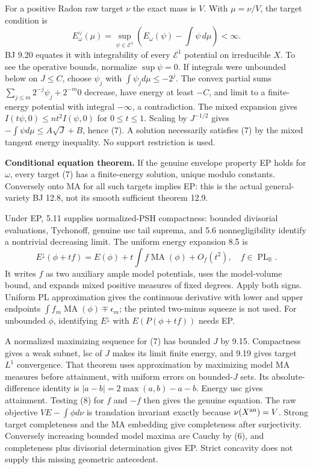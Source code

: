\documentclass[
  10pt,
]{article}
\begin{document}
For a positive Radon raw target \(\nu\) the exact mass is \(V\). With
\(\mu=\nu/V\), the target condition is
\[E^\vee_\omega(\mu)=\sup_{\psi\in\mathcal E^1}
 \left(E_\omega(\psi)-\int\psi\,d\mu\right)<\infty. \tag{7}\] BJ 9.20
equates it with integrability of every \(\mathcal E^1\) potential on
irreducible \(X\). To see the operative bounds, normalize
\(\sup\psi=0\). If integrals were unbounded below on \(J\le C\), choose
\(\psi_j\) with \(\int\psi_jd\mu\le-2^j\). The convex partial sums
\(\sum_{j\le m}2^{-j}\psi_j+2^{-m}0\) decrease, have energy at least
\(-C\), and limit to a finite-energy potential with integral
\(-\infty\), a contradiction. The mixed expansion gives
\(I(t\psi,0)\le nt^2I(\psi,0)\) for \(0\le t\le1\). Scaling by
\(J^{-1/2}\) gives \(-\int\psi d\mu\le A\sqrt J+B\), hence (7). A
solution necessarily satisfies (7) by the mixed tangent energy
inequality. No support restriction is used.

\textbf{Conditional equation theorem.} If the genuine envelope property
EP holds for \(\omega\), every target (7) has a finite-energy solution,
unique modulo constants. Conversely onto MA for all such targets implies
EP: this is the actual general-variety BJ 12.8, not its smooth
sufficient theorem 12.9.

Under EP, 5.11 supplies normalized-PSH compactness: bounded divisorial
evaluations, Tychonoff, genuine usc tail suprema, and 5.6
nonnegligibility identify a nontrivial decreasing limit. The uniform
energy expansion 8.5 is
\[E^\downarrow(\phi+tf)=E(\phi)+t\int f\operatorname{MA}(\phi)+O_f(t^2),\quad f\in\operatorname{PL}_{\mathbb R}. \tag{8}\]
It writes \(f\) as two auxiliary ample model potentials, uses the
model-volume bound, and expands mixed positive measures of fixed
degrees. Apply both signs. Uniform PL approximation gives the continuous
derivative with lower and upper endpoints
\(\int f_m\operatorname{MA}(\phi)\mp\epsilon_m\); the printed two-minus
squeeze is not used. For unbounded \(\phi\), identifying
\(E^\downarrow\) with \(E(P(\phi+tf))\) needs EP.

A normalized maximizing sequence for (7) has bounded \(J\) by 9.15.
Compactness gives a weak subnet, lsc of \(J\) makes its limit finite
energy, and 9.19 gives target \(L^1\) convergence. That theorem uses
approximation by maximizing model MA measures before attainment, with
uniform errors on bounded-\(J\) sets. Its absolute-difference identity
is \(|a-b|=2\max(a,b)-a-b\). Energy usc gives attainment. Testing (8)
for \(f\) and \(-f\) then gives the genuine equation. The raw objective
\(VE-\int\phi d\nu\) is translation invariant exactly because
\(\nu(X^{\rm an})=V\). Strong target completeness and the MA embedding
give completeness after surjectivity. Conversely increasing bounded
model maxima are Cauchy by (6), and completeness plus divisorial
determination gives EP. Strict concavity does not supply this missing
geometric antecedent.
\end{document}
